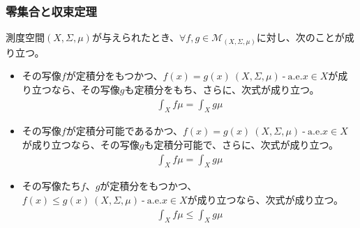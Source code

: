 \documentclass[dvipdfmx]{jsarticle}
\begin{document}
\subsubsection{零集合と収束定理}%
\begin{thm}\label{4.6.3.5}
測度空間$(X,\varSigma,\mu)$が与えられたとき、$\forall f,g \in \mathcal{M}_{(X,\varSigma,\mu)}$に対し、次のことが成り立つ。
\begin{itemize}
\item
  その写像$f$が定積分をもつかつ、$f(x) = g(x)\ (X,\varSigma,\mu) \ \text{-} \ \mathrm{a.e.}x \in X$が成り立つなら、その写像$g$も定積分をもち、さらに、次式が成り立つ。
\begin{align*}
\int_{X} {f\mu} = \int_{X} {g\mu}
\end{align*}
\item
  その写像$f$が定積分可能であるかつ、$f(x) = g(x)\ (X,\varSigma,\mu) \ \text{-} \ \mathrm{a.e.}x \in X$が成り立つなら、その写像$g$も定積分可能で、さらに、次式が成り立つ。
\begin{align*}
\int_{X} {f\mu} = \int_{X} {g\mu}
\end{align*}
\item
  その写像たち$f$、$g$が定積分をもつかつ、$f(x) \leq g(x)\ (X,\varSigma,\mu) \ \text{-} \ \mathrm{a.e.}x \in X$が成り立つなら、次式が成り立つ。
\begin{align*}
\int_{X} {f\mu} \leq \int_{X} {g\mu}
\end{align*}
\end{itemize}
\end{thm}
\end{document}
